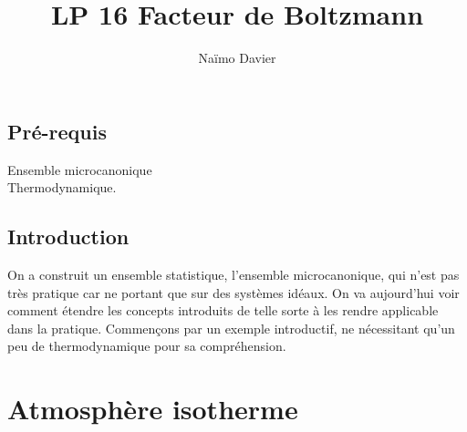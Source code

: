 \documentclass[12pt,prb,aps,epsf]{article}
\begin{document}
	
	\title{LP 16 Facteur de Boltzmann}
	\author{Naïmo Davier}
	
	\maketitle
	
	\tableofcontents
	
	\pagebreak
	
	
\subsection{Pré-requis}
Ensemble microcanonique\\
Thermodynamique.

\subsection{Introduction}

On a construit un ensemble statistique, l'ensemble microcanonique, qui n'est pas très pratique car ne portant que sur des systèmes idéaux. On va aujourd'hui voir comment étendre les concepts introduits de telle sorte à les rendre applicable dans la pratique. 
Commençons par un exemple introductif, ne nécessitant qu'un peu de thermodynamique pour sa compréhension.

\section{Atmosphère isotherme}
\end{document}

